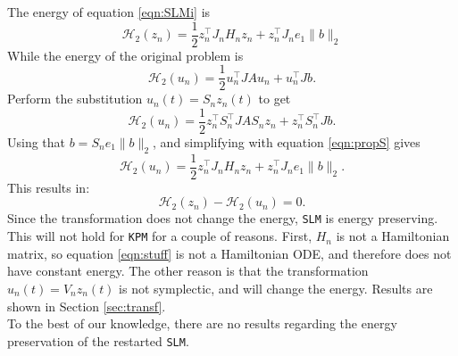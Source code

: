 \noindent The energy of equation \eqref{eqn:SLMi} is
\begin{equation*}
\mathcal{H}_2(z_n) = \frac{1}{2}z_n^\top J_n H_n z_n + z_n^\top J_n e_1 \|b \|_2
\end{equation*}
\noindent While the energy of the original problem is 
\begin{equation*}
\mathcal{H}_2(u_n) = \frac{1}{2}u_n^\top J A u_n + u_n^\top J b.
\end{equation*}
Perform the substitution $ u_n(t) = S_n z_n(t) $ to get
\begin{equation*}
\mathcal{H}_2(u_n) = \frac{1}{2}z_n^\top S_n^\top J A S_n z_n + z_n^\top S_n^\top J b.
\end{equation*}
Using that $ b = S_n e_1 \| b \|_2 $, and simplifying with equation \eqref{eqn:propS} gives 
\begin{equation*}
\mathcal{H}_2(u_n) = \frac{1}{2}z_n^\top J_n H_n z_n + z_n^\top J_n e_1 \|b \|_2.
\end{equation*}
This results in: 
\begin{equation*}
\mathcal{H}_2(z_n) - \mathcal{H}_2(u_n) = 0.
\end{equation*}
Since the transformation does not change the energy, \texttt{SLM} is energy preserving. This will not hold for \texttt{KPM} for a couple of reasons. First, $H_n$ is not a Hamiltonian matrix, so equation \eqref{eqn:stuff} is not a Hamiltonian ODE, and therefore does not have constant energy. The other reason is that the transformation $u_n(t) = V_nz_n(t)$ is not symplectic, and will change the energy. Results are shown in Section \ref{sec:transf}.\\ 

\noindent To the best of our knowledge, there are no results regarding the energy preservation of the restarted \texttt{SLM}.

